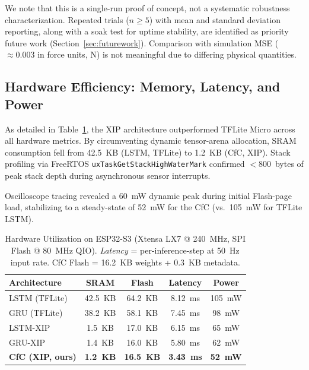 \documentclass[conference]{IEEEtran}
\begin{document}
We note that this is a single-run proof of concept, not a systematic
robustness characterization. Repeated trials ($n \geq 5$) with mean and
standard deviation reporting, along with a soak test for uptime stability,
are identified as priority future work (Section~\ref{sec:futurework}).
Comparison with simulation MSE ($\approx 0.003$ in force units, N) is
not meaningful due to differing physical quantities.

\subsection{Hardware Efficiency: Memory, Latency, and Power}
As detailed in Table~\ref{tab:hardware}, the XIP architecture outperformed
TFLite Micro across all hardware metrics. By circumventing dynamic tensor-arena
allocation, SRAM consumption fell from 42.5~KB (LSTM, TFLite) to 1.2~KB
(CfC, XIP). Stack profiling via FreeRTOS
\texttt{uxTaskGetStackHighWaterMark} confirmed $<$800~bytes of peak stack
depth during asynchronous sensor interrupts.

Oscilloscope tracing revealed a 60~mW dynamic peak during initial Flash-page
load, stabilizing to a steady-state of 52~mW for the CfC (vs.\ 105~mW for
TFLite LSTM).

\begin{table}[h]
\centering
\caption{Hardware Utilization on ESP32-S3 (Xtensa LX7 @ 240~MHz,
         SPI Flash @ 80~MHz QIO). \emph{Latency} = per-inference-step at
         50~Hz input rate. CfC Flash = 16.2~KB weights + 0.3~KB metadata.}
\label{tab:hardware}
\begin{tabular}{|l|c|c|c|c|}
\hline
\textbf{Architecture} & \textbf{SRAM} & \textbf{Flash} & \textbf{Latency} & \textbf{Power} \\ \hline
LSTM (TFLite)  & 42.5~KB & 64.2~KB & 8.12~ms & 105~mW \\ \hline
GRU (TFLite)   & 38.2~KB & 58.1~KB & 7.45~ms & 98~mW  \\ \hline
LSTM-XIP       & 1.5~KB  & 17.0~KB & 6.15~ms & 65~mW  \\ \hline
GRU-XIP        & 1.4~KB  & 16.0~KB & 5.80~ms & 62~mW  \\ \hline
\textbf{CfC (XIP, ours)} & \textbf{1.2~KB} & \textbf{16.5~KB} & \textbf{3.43~ms} & \textbf{52~mW} \\ \hline
\end{tabular}
\end{table}
\end{document}

